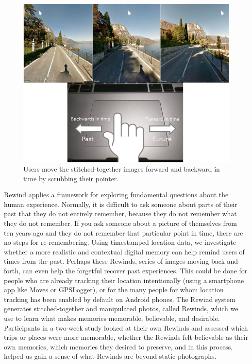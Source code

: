 \documentclass{sigchi}
\begin{document}
\begin{figure}
   \centering
     \includegraphics[width=1\linewidth]{scroll}
     \caption{Users move the stitched-together images forward and backward in time by scrubbing their pointer.}
     \label{fig:scrubbing}
\end{figure}

Rewind applies a framework for exploring fundamental questions about the human experience. Normally, it is difficult to ask someone about parts of their past that they do not entirely remember, because they do not remember what they do not remember. If you ask someone about a picture of themselves from ten years ago and they do not remember that particular point in time, there are no steps for re-remembering. Using timestamped location data, we investigate whether a more realistic and contextual digital memory can help remind users of times from the past. Perhaps these Rewinds, series of images moving back and forth, can even help the forgetful recover past experiences. This could be done for people who are already tracking their location intentionally (using a smartphone app like Moves or GPSLogger), or for the many people for whom location tracking has been enabled by default on Android phones. The Rewind system generates stitched-together and manipulated photos, called Rewinds, which we use to learn what makes memories memorable, believable, and desirable. Participants in a two-week study looked at their own Rewinds and assessed which trips or places were more memorable, whether the Rewinds felt believable as their own memories, which memories they desired to preserve, and in this process, helped us gain a sense of what Rewinds are beyond static photographs.
 
\end{document}
